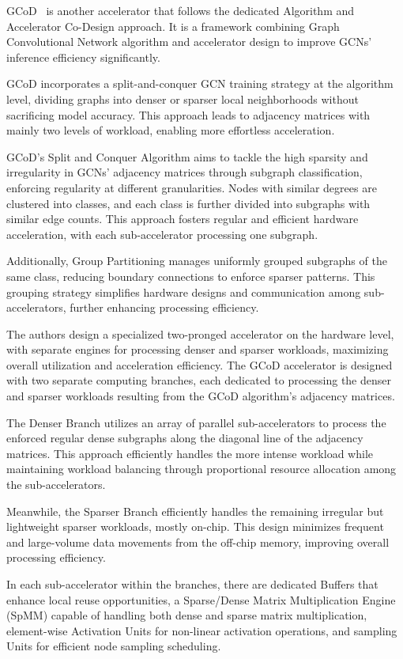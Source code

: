 GCoD~\cite{9773223} is another accelerator that follows the dedicated Algorithm and Accelerator Co-Design approach.
It is a framework combining Graph Convolutional Network algorithm and accelerator design to improve GCNs' inference efficiency significantly.

GCoD incorporates a split-and-conquer GCN training strategy at the algorithm level, dividing graphs into denser or sparser local neighborhoods without sacrificing model accuracy.
This approach leads to adjacency matrices with mainly two levels of workload, enabling more effortless acceleration.

GCoD's Split and Conquer Algorithm aims to tackle the high sparsity and irregularity in GCNs' adjacency matrices through subgraph classification, enforcing regularity at different granularities.
Nodes with similar degrees are clustered into classes, and each class is further divided into subgraphs with similar edge counts.
This approach fosters regular and efficient hardware acceleration, with each sub-accelerator processing one subgraph.

Additionally, Group Partitioning manages uniformly grouped subgraphs of the same class, reducing boundary connections to enforce sparser patterns.
This grouping strategy simplifies hardware designs and communication among sub-accelerators, further enhancing processing efficiency.

The authors design a specialized two-pronged accelerator on the hardware level, with separate engines for processing denser and sparser workloads, maximizing overall utilization and acceleration efficiency.
The GCoD accelerator is designed with two separate computing branches, each dedicated to processing the denser and sparser workloads resulting from the GCoD algorithm's adjacency matrices.

The Denser Branch utilizes an array of parallel sub-accelerators to process the enforced regular dense subgraphs along the diagonal line of the adjacency matrices.
This approach efficiently handles the more intense workload while maintaining workload balancing through proportional resource allocation among the sub-accelerators.

Meanwhile, the Sparser Branch efficiently handles the remaining irregular but lightweight sparser workloads, mostly on-chip.
This design minimizes frequent and large-volume data movements from the off-chip memory, improving overall processing efficiency.

In each sub-accelerator within the branches, there are dedicated Buffers that enhance local reuse opportunities,
a Sparse/Dense Matrix Multiplication Engine (SpMM) capable of handling both dense and sparse matrix multiplication,
element-wise Activation Units for non-linear activation operations, and sampling Units for efficient node sampling scheduling.

